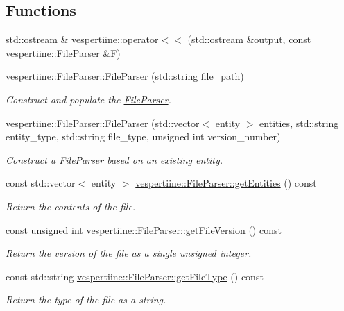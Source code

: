 \subsection*{Functions}
\begin{DoxyCompactItemize}
\item 
std\+::ostream \& \hyperlink{group__vespertiine_ga1ca507e4b8f52201ba9cccaaf496e9be}{vespertiine\+::operator$<$$<$} (std\+::ostream \&output, const \hyperlink{classvespertiine_1_1FileParser}{vespertiine\+::\+File\+Parser} \&F)
\item 
\hyperlink{group__vespertiine_ga01e372573c11d4c2848419c8842d583e}{vespertiine\+::\+File\+Parser\+::\+File\+Parser} (std\+::string file\+\_\+path)
\begin{DoxyCompactList}\small\item\em Construct and populate the \hyperlink{classvespertiine_1_1FileParser}{File\+Parser}. \end{DoxyCompactList}\item 
\hyperlink{group__vespertiine_gad562ef6be958292fbc74803d47b0eda3}{vespertiine\+::\+File\+Parser\+::\+File\+Parser} (std\+::vector$<$ entity $>$ entities, std\+::string entity\+\_\+type, std\+::string file\+\_\+type, unsigned int version\+\_\+number)
\begin{DoxyCompactList}\small\item\em Construct a \hyperlink{classvespertiine_1_1FileParser}{File\+Parser} based on an existing entity. \end{DoxyCompactList}\item 
const std\+::vector$<$ entity $>$ \hyperlink{group__vespertiine_gac2360eb7febe37b75f13dc697a3d37ed}{vespertiine\+::\+File\+Parser\+::get\+Entities} () const 
\begin{DoxyCompactList}\small\item\em Return the contents of the file. \end{DoxyCompactList}\item 
const unsigned int \hyperlink{group__vespertiine_ga69070e93ff23a24380d0bad1c096205a}{vespertiine\+::\+File\+Parser\+::get\+File\+Version} () const 
\begin{DoxyCompactList}\small\item\em Return the version of the file as a single unsigned integer. \end{DoxyCompactList}\item 
const std\+::string \hyperlink{group__vespertiine_ga950b19f6ead99d8297e37eaeeed2fd3f}{vespertiine\+::\+File\+Parser\+::get\+File\+Type} () const 
\begin{DoxyCompactList}\small\item\em Return the type of the file as a string. \end{DoxyCompactList}\end{DoxyCompactItemize}
